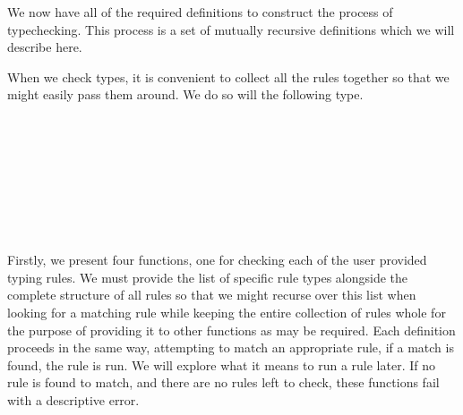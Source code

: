 We now have all of the required definitions to construct the process of
typechecking. This process is a set of mutually recursive definitions which
we will describe here.

When we check types, it is convenient to collect all the rules together so
that we might easily pass them around. We do so will the following type.

\begin{code}%
\>[0]\AgdaSpace{}%
\AgdaSpace{}%
\AgdaSymbol{:}\AgdaSpace{}%
\AgdaSpace{}%
\<%
\\
\>[0][@{}l@{\AgdaIndent{0}}]%
\>[2]\AgdaSpace{}%
\AgdaSymbol{:}%
\>[113I]\AgdaSpace{}%
%
\>[22]\<%
\\
\>[.][@{}l@{}]\<[113I]%
\>[7]\AgdaSpace{}%
%
\>[22]\<%
\\
%
\>[7]\AgdaSpace{}%
%
\>[22]\<%
\\
%
\>[7]\AgdaSpace{}%
%
\>[22]\<%
\\
%
\>[7]\AgdaSpace{}%
%
\>[22]\<%
\\
%
\>[7]\AgdaSpace{}%
%
\>[22]\<%
\\
%
\>[7]\<%
\end{code}


Firstly, we present four functions, one for checking each of the user
provided typing rules. We must provide the list of specific rule types
alongside the complete structure of all rules so that we might recurse
over this list when looking for a matching rule while keeping the entire
collection of rules whole for the purpose of providing it to other
functions as may be required. Each definition proceeds in the same way,
attempting to match an appropriate rule, if a match is found, the rule is
run. We will explore what it means to run a rule later. If no rule is
found to match, and there are no rules left to check, these functions
fail with a descriptive error.

